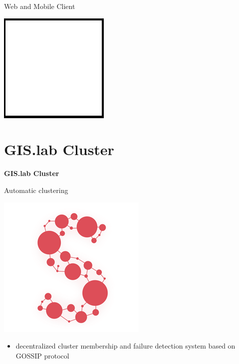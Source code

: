 \documentclass[12pt]{beamer}
\begin{document}
\begin{frame}{Web and Mobile Client}
	\begin{center}
		\includegraphics[keepaspectratio=true,height=0.5\textheight]{images/image.png}
	\end{center}
\end{frame}


\section{GIS.lab Cluster}
\begin{frame}
	\begin{center}
		\LARGE\textbf{GIS.lab Cluster}	
	\end{center}
\end{frame}

\begin{frame}{Automatic clustering}
	\begin{center}
		\includegraphics[keepaspectratio=true,height=0.5\textheight]{images/serf.png}
	\end{center}
	\begin{itemize}
		\item decentralized cluster membership and failure detection system based on GOSSIP protocol
	\end{itemize}
\end{frame}
\end{document}
